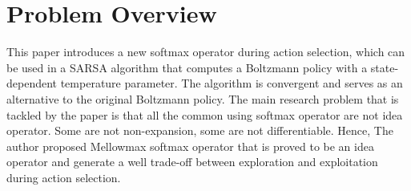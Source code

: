 \section{Problem Overview}
\label{section:intro}
This paper introduces a new softmax operator during action selection, which can be used in a SARSA algorithm that computes a Boltzmann policy with a state-dependent temperature parameter. The algorithm is convergent and serves as an alternative to the original Boltzmann policy. The main research problem that is tackled by the paper is that all the common using softmax operator are not idea operator. Some are not non-expansion, some are not differentiable. Hence, The author proposed Mellowmax softmax operator that is proved to be an idea operator and generate a well trade-off between exploration and exploitation during action selection.